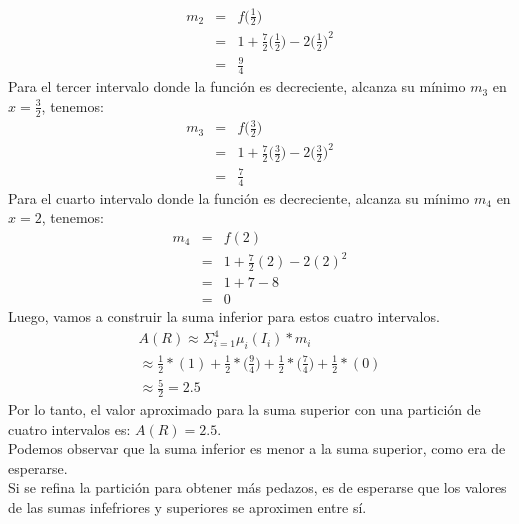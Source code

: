 \begin{ejer}[1]
			\begin{eqnarray*}
				m_2 &=& f\Big(\frac{1}{2} \Big) \\
				&=& 1 + \frac{7}{2}\Big(\frac{1}{2} \Big) - 2\Big(\frac{1}{2} \Big)^2 \\ 
				&=& \frac{9}{4} 
			\end{eqnarray*}
			Para el tercer intervalo donde la función es decreciente, alcanza su mínimo $m_3$ en $x = \frac{3}{2}$, tenemos: 
			\begin{eqnarray*}
				m_3 &=& f\Big(\frac{3}{2} \Big) \\
				&=& 1 + \frac{7}{2}\Big(\frac{3}{2} \Big) - 2\Big(\frac{3}{2} \Big)^2 \\ 
				&=& \frac{7}{4} 
			\end{eqnarray*}
			Para el cuarto intervalo donde la función es decreciente, alcanza su mínimo $m_4$ en $x = 2$, tenemos: 
			\begin{eqnarray*}
				m_4 &=& f(2) \\
				&=& 1 + \frac{7}{2}(2) - 2(2)^2 \\ 
				&=& 1 + 7 - 8 \\
				&=& 0
			\end{eqnarray*}
			Luego, vamos a construir la suma inferior para estos cuatro intervalos. 
			\begin{eqnarray*}
				A(R) \approx \Sigma_{i=1}^4 \mu_i (I_i) * m_i \\ 
				\approx \frac{1}{2}*(1) + \frac{1}{2}*\Big(\frac{9}{4}\Big) + \frac{1}{2}*\Big(\frac{7}{4}\Big) + \frac{1}{2}*(0) \\ 
				\approx \frac{5}{2} = 2.5
			\end{eqnarray*}
			Por lo tanto, el valor aproximado para la suma superior con una partición de cuatro intervalos es: $ A(R) = 2.5 $. \\
			Podemos observar que la suma inferior es menor a la suma superior, como era de esperarse.\\ 
			Si se refina la partición para obtener más pedazos, es de esperarse que los valores de las sumas infefriores y superiores se aproximen entre sí. 
			\end{ejer}
